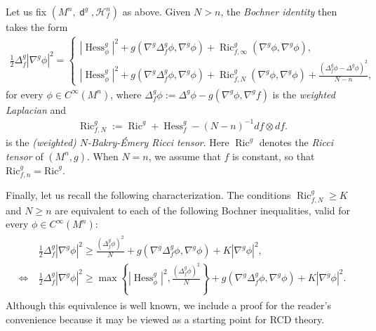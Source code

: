 \documentclass[11pt,reqno]{amsart}
\theoremstyle{definition}
\numberwithin{equation}{section}
\DeclareMathOperator{\dist}{\mathsf{d}}
\DeclareMathOperator{\Hess}{Hess}
\DeclareMathOperator{\Ric}{Ric}
\newcommand{\haus}{\mathscr{H}}
\begin{document}
Let us fix $(M^n, \dist^g, \haus^n_f)$ as above. Given $N > n$, the \textit{Bochner identity} then takes the form
\begin{align}\label{eq:weighted bochner}
    \frac{1}{2}\Delta^g_f|\nabla^g\phi|^2 =  
    \begin{cases}
|\Hess_{\phi}^g|^2+g(\nabla^g\Delta_f^g\phi, \nabla^g\phi)+\Ric_{f,\infty}^g(\nabla^g\phi, \nabla^g\phi), \\
|\Hess^g_{\phi}|^2+g(\nabla^g\Delta_f^g\phi, \nabla^g\phi)+\Ric_{f,N}^g(\nabla^g\phi, \nabla^g\phi)+\frac{\displaystyle{(\Delta^g_f\phi-\Delta^g\phi)^2}}{\displaystyle{N-n}}, 
    \end{cases}   
\end{align}
for every $\phi \in C^{\infty}(M^n)$, where 
    $
    \Delta^g_f\phi:=\Delta^g\phi-g(\nabla^g\phi,\nabla^gf)
$ is the \textit{weighted Laplacian} 
    and \begin{align}
\Ric^g_{f, N}:=\Ric^g+\Hess_f^g-(N-n)^{-1}d f\otimes d f.
\end{align} is the \textit{(weighted) $N$-Bakry-\'Emery Ricci tensor}.
Here $\Ric^g$ denotes the \textit{Ricci tensor} of $(M^n, g)$. When $N=n$, we assume that $f$ is constant, so that $\mathrm{Ric}^g_{f,n}=\mathrm{Ric}^g$.

Finally, let us recall the following characterization. The conditions $\Ric^g_{f, N}\ge K$ and $N \ge n$ are equivalent to each of the following Bochner inequalities,  valid for every $\phi \in C^{\infty}(M^n)$:
\begin{align}\label{88nnsbshshshsh}
\begin{split}
&\ \frac{1}{2}\Delta^g_f|\nabla^g\phi|^2\ge \frac{(\Delta^g_f\phi)^2}{N}+g(\nabla^g\Delta^g_f\phi,\nabla^g\phi)+K|\nabla^g\phi|^2,  \\
    \Longleftrightarrow &\ \frac{1}{2}\Delta^g_f|\nabla^g\phi|^2\ge \max\left\{|\Hess_{\phi}^g|^2, \frac{(\Delta^g_f\phi)^2}{N}\right\}+g(\nabla^g\Delta^g_f\phi,\nabla^g\phi)+K|\nabla^g\phi|^2.    \end{split}
\end{align}
Although this equivalence is well known, we include a proof for the reader's convenience because it may be viewed as a starting point for RCD theory.
\end{document}
